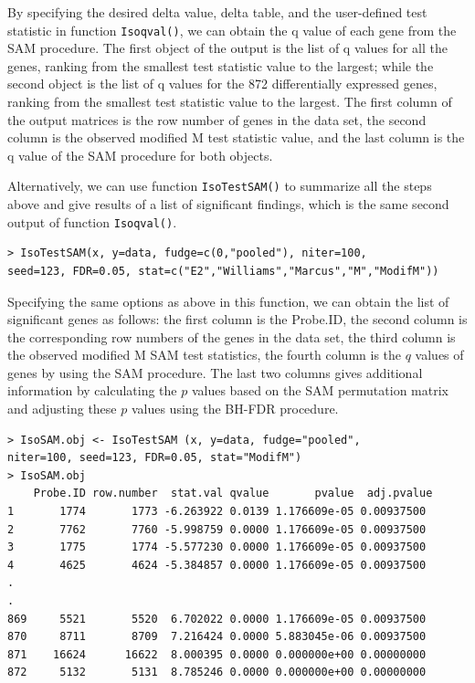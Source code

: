 By specifying the desired delta value, delta table, and the user-defined test statistic in function \texttt{Isoqval()}, we can obtain
the q value of each gene from the SAM procedure. The first object of the output is the list of q values for
all the genes, ranking from the smallest test statistic value to the largest; while the second object is the list of q values
for the 872 differentially expressed genes, ranking from the smallest test statistic value to the largest. The first column of the output matrices is the row number of genes in
the data set, the second column is the observed modified M test statistic value, and the last column is the q value of the
SAM procedure for both objects.


Alternatively, we can use function \texttt{IsoTestSAM()} to summarize all the steps above and give results of a list of significant findings, which is the same second output of function \texttt{Isoqval()}.
\begin{center}
\begin{boxit}
\begin{verbatim}
> IsoTestSAM(x, y=data, fudge=c(0,"pooled"), niter=100, 
seed=123, FDR=0.05, stat=c("E2","Williams","Marcus","M","ModifM"))
\end{verbatim}
\end{boxit}
\end{center}

Specifying the same options as above in this function, we can obtain the list of significant genes as follows: the first column is the Probe.ID, the second column is the corresponding row numbers of the genes in the data set, the third column is the observed modified M SAM test statistics, the fourth column is the $q$ values of genes by using the SAM procedure. The last two columns gives additional information by calculating the $p$ values based on the SAM permutation matrix and adjusting these $p$ values using the BH-FDR procedure.
\begin{center}
\begin{boxit}
\begin{verbatim}
> IsoSAM.obj <- IsoTestSAM (x, y=data, fudge="pooled", 
niter=100, seed=123, FDR=0.05, stat="ModifM")
> IsoSAM.obj 
    Probe.ID row.number  stat.val qvalue       pvalue  adj.pvalue
1       1774       1773 -6.263922 0.0139 1.176609e-05 0.00937500
2       7762       7760 -5.998759 0.0000 1.176609e-05 0.00937500
3       1775       1774 -5.577230 0.0000 1.176609e-05 0.00937500
4       4625       4624 -5.384857 0.0000 1.176609e-05 0.00937500
.
.
869     5521       5520  6.702022 0.0000 1.176609e-05 0.00937500
870     8711       8709  7.216424 0.0000 5.883045e-06 0.00937500
871    16624      16622  8.000395 0.0000 0.000000e+00 0.00000000
872     5132       5131  8.785246 0.0000 0.000000e+00 0.00000000
\end{verbatim}
\end{boxit}
\end{center}


